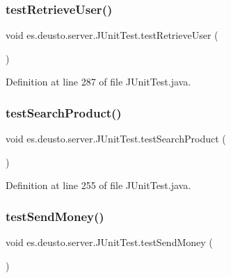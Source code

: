 \subsubsection{\texorpdfstring{test\+Retrieve\+User()}{testRetrieveUser()}}
{\footnotesize\ttfamily void es.\+deusto.\+server.\+J\+Unit\+Test.\+test\+Retrieve\+User (\begin{DoxyParamCaption}{ }\end{DoxyParamCaption})}



Definition at line 287 of file J\+Unit\+Test.\+java.

\mbox{\label{classes_1_1deusto_1_1server_1_1_j_unit_test_a1a63f85e03a2c22d000ae9f3d2697159}} 
\subsubsection{\texorpdfstring{test\+Search\+Product()}{testSearchProduct()}}
{\footnotesize\ttfamily void es.\+deusto.\+server.\+J\+Unit\+Test.\+test\+Search\+Product (\begin{DoxyParamCaption}{ }\end{DoxyParamCaption})}



Definition at line 255 of file J\+Unit\+Test.\+java.

\mbox{\label{classes_1_1deusto_1_1server_1_1_j_unit_test_a3d96e27fee6cffb14a0f43b9516c9eb9}} 
\subsubsection{\texorpdfstring{test\+Send\+Money()}{testSendMoney()}}
{\footnotesize\ttfamily void es.\+deusto.\+server.\+J\+Unit\+Test.\+test\+Send\+Money (\begin{DoxyParamCaption}{ }\end{DoxyParamCaption})}



